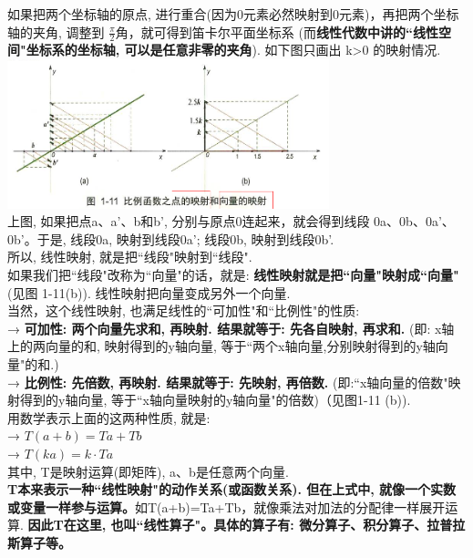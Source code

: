 \documentclass[UTF8]{ctexart}
\begin{document}
如果把两个坐标轴的原点, 进行重合(因为0元素必然映射到0元素)，再把两个坐标轴的夹角, 调整到 $\frac{\pi}{2}$角，就可得到笛卡尔平面坐标系 (而\textbf{线性代数中讲的``线性空间"坐标系的坐标轴, 可以是任意非零的夹角}). 如下图只画出 k>0 的映射情况. \\
\includegraphics[width=0.7\textwidth]{img/0118.png}\\

上图, 如果把点a、a'、b和b', 分别与原点0连起来，就会得到线段 0a、0b、0a'、0b'。于是, 线段0a, 映射到线段0a'; 线段0b, 映射到线段0b'.\\
所以, 线性映射, 就是把``线段"映射到``线段". \\
如果我们把``线段"改称为``向量"的话，就是: \textbf{线性映射就是把``向量"映射成``向量"}(见图 1-11(b)). 线性映射把向量变成另外一个向量.\\

当然，这个线性映射, 也满足线性的``可加性"和``比例性"的性质: \\
→ \textbf{可加性: 两个向量先求和, 再映射. 结果就等于: 先各自映射, 再求和.} (即: x轴上的两向量的和, 映射得到的y轴向量, 等于``两个x轴向量,分别映射得到的y轴向量"的和.) \\
→ \textbf{比例性:  先倍数, 再映射. 结果就等于: 先映射, 再倍数.} (即:``x轴向量的倍数"映射得到的y轴向量, 等于``x轴向量映射的y轴向量"的倍数)（见图1-11 (b)).\\

用数学表示上面的这两种性质, 就是: \\
→ $T(a+b) = Ta + Tb$ \\
→ $T(ka) = k \cdot Ta$ \\
其中, T是映射运算(即矩阵), a、b是任意两个向量. \\

\textbf{T本来表示一种``线性映射"的动作关系(或函数关系). 但在上式中, 就像一个实数或变量一样参与运算。}如T(a+b)=Ta+Tb，就像乘法对加法的分配律一样展开运算. \textbf{因此T在这里, 也叫``线性算子"。具体的算子有: 微分算子、积分算子、拉普拉斯算子等。} \\
\end{document}
